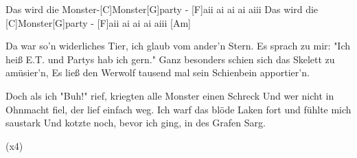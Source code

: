 \begin{guitar}
	\begin{highlightbar}
		Das wird die Monster-[C]Monster[G]party - [F]aii ai ai ai aiii
		Das wird die [C]Monster[G]party - [F]aii ai ai ai aiii [Am]{}
	\end{highlightbar}
	
	\songsection{Strophe 4}
	Da war so'n widerliches Tier, ich glaub vom ander'n Stern.
	Es sprach zu mir: "Ich heiß E.T. und Partys hab ich gern."
	Ganz besonders schien sich das Skelett zu amüsier'n,
	Es ließ den Werwolf tausend mal sein Schienbein apportier'n.
	
	Doch als ich "Buh!" rief, kriegten alle Monster einen Schreck
	Und wer nicht in Ohnmacht fiel, der lief einfach weg.
	Ich warf das blöde Laken fort und fühlte mich saustark
	Und kotzte noch, bevor ich ging, in des Grafen Sarg.
	
	\begin{highlightbar}
		  (x4)
	\end{highlightbar}
\end{guitar}
